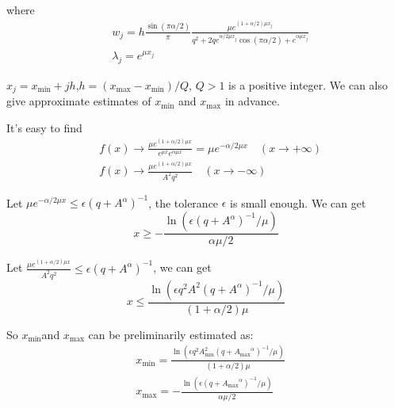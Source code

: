 where
\begin{equation}
	\begin{aligned}
		&w_j=h\frac{\sin(\pi \alpha/2)}{\pi}\frac{\mu e^{(1+\alpha/2)\mu x_j}}{q^2+2qe^{\alpha/2 \mu x_j}\cos(\pi\alpha/2)+e^{\alpha \mu x_j}}\\
		&\lambda_j=e^{\mu x_j}
	\end{aligned}
\label{lw_SE1_q}
\end{equation}

$x_j=x_{\min}+jh$,$h=(x_{\max}-x_{\min})/Q$, $Q>1$ is a positive integer. We can also give approximate estimates of $x_{\min}$ and $x_{\max}$ in advance.

It's easy to find
\begin{equation}
	\begin{aligned}
		& f(x)\rightarrow \frac{\mu e^{(1+\alpha/2)\mu x}}{e^{\mu x}e^{\alpha\mu x}}=\mu e^{-\alpha/2 \mu x} \quad (x \rightarrow +\infty)\\
		& f(x)\rightarrow \frac{\mu e^{(1+\alpha/2)\mu x}}{A^2q^2} \quad (x \rightarrow -\infty)
	\end{aligned}
	\label{AS_SE1}
\end{equation}

Let $\mu e^{-\alpha/2 \mu x}\leq \epsilon (q+{A}^{\alpha})^{-1}$, the tolerance $\epsilon$ is small enough. We can get
\begin{equation}
	x\geq -\frac{\ln(\epsilon (q+{A}^{\alpha})^{-1}/\mu)}{\alpha \mu/2}
\end{equation}

Let $\frac{\mu e^{(1+\alpha/2)\mu x}}{A^2 q^2}  \leq \epsilon (q+{A}^{\alpha})^{-1}$, we can get
\begin{equation}
	x\leq \frac{\ln(\epsilon q^2 A^2 (q+{A}^{\alpha})^{-1}/\mu)}{(1+\alpha/2)\mu}
\end{equation}

So  $x_{\min}$and $x_{\max}$ can be preliminarily estimated as:
\begin{equation}
	\begin{aligned}
		&x_{\min}= \frac{\ln(\epsilon q^2 A^2_{\min} (q+{A_{\max}}^{\alpha})^{-1}/\mu)}{(1+\alpha/2)\mu}\\
		&x_{\max}=-\frac{\ln(\epsilon (q+{A_{\max}}^{\alpha})^{-1}/\mu)}{\alpha \mu/2}
	\end{aligned}
\label{findminmax_SE1_q}
\end{equation}

